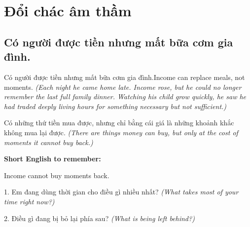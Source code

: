 \chapter{Đổi chác âm thầm}

\section{Có người được tiền nhưng mất bữa cơm gia đình.}
\begin{truyen}{Có người được tiền nhưng mất bữa cơm gia đình.}{Income can replace meals, not moments.}
\textit{(Each night he came home late. Income rose, but he could no longer remember the last full family dinner. Watching his child grow quickly, he saw he had traded deeply living hours for something necessary but not sufficient.)}
\end{truyen}
\begin{baihoc}
Có những thứ tiền mua được, nhưng chỉ bằng cái giá là những khoảnh khắc không mua lại được.
\textit{(There are things money can buy, but only at the cost of moments it cannot buy back.)}
\end{baihoc}
\begin{ghinhoanh}\textbf{Short English to remember:}

Income cannot buy moments back.
\end{ghinhoanh}
\begin{tuhocnhanh}
1. Em đang dùng thời gian cho điều gì nhiều nhất? \textit{(What takes most of your time right now?)}

2. Điều gì đang bị bỏ lại phía sau? \textit{(What is being left behind?)}
\end{tuhocnhanh}
\ngancach

